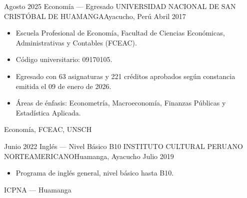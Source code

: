 

\begin{experiences}
	
	\experience
	{Agosto 2025}    {Economía — Egresado}
	{UNIVERSIDAD NACIONAL DE SAN CRISTÓBAL DE HUAMANGA}{Ayacucho, Perú}
	{Abril 2017}
	{
		\begin{itemize}
			\item Escuela Profesional de Economía, Facultad de Ciencias Económicas,
			Administrativas y Contables (FCEAC).
			\item Código universitario: 09170105.
			\item Egresado con 63 asignaturas y 221 créditos aprobados según
			constancia emitida el 09 de enero de 2026.
			\item Áreas de énfasis: Econometría, Macroeconomía, Finanzas Públicas
			y Estadística Aplicada.
		\end{itemize}
	}
	{Economía, FCEAC, UNSCH}
	\emptySeparator
	
	\experience
	{Junio 2022}    {Inglés — Nivel Básico B10}
	{INSTITUTO CULTURAL PERUANO NORTEAMERICANO}{Huamanga, Ayacucho}
	{Julio 2019}
	{
		\begin{itemize}
			\item Programa de inglés general, nivel básico hasta B10.
		\end{itemize}
	}
	{ICPNA — Huamanga}
	\emptySeparator
	
	
\end{experiences}
